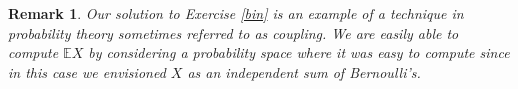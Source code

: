 \documentclass[12pt, reqno]{amsart}
\newtheorem{remark}{Remark}
\newcommand{\E}{{\mathbb E}}     %
\begin{document}
\begin{remark}  Our solution to Exercise \ref{bin} is an example of a technique in probability theory sometimes referred to as coupling.   We are easily able to compute $ \E X$ by considering a probability space where it was easy to compute since in this case we envisioned $X$ as an independent sum of Bernoulli's.  

\end{remark}
\end{document}
